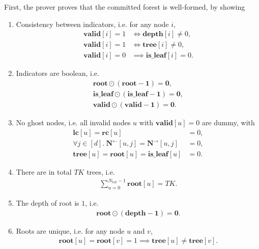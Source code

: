 First, the prover proves that the committed forest is well-formed, by showing
\begin{enumerate}
  \item Consistency between indicators, i.e. for any node $i$,
  \begin{align}
    \mathbf{valid}[i]=1 &\iff \mathbf{depth}[i] \neq 0,\\
    \mathbf{valid}[i]=1 &\iff \mathbf{tree}[i] \neq 0,\\
    \mathbf{valid}[i]=0 &\implies \mathbf{is\_leaf}[i] = 0.
  \end{align}

  \item Indicators are boolean, i.e.
  \begin{align}
    \mathbf{root}\odot(\mathbf{root}-\mathbf{1}) = \mathbf{0},\\
    \mathbf{is\_leaf}\odot(\mathbf{is\_leaf}-\mathbf{1}) = \mathbf{0},\\
    \mathbf{valid}\odot(\mathbf{valid}-\mathbf{1}) = \mathbf{0}.
  \end{align}

  \item No ghost nodes, i.e. all invalid nodes $u$ with $\mathbf{valid}[u]=0$ are dummy, with
    \begin{align}
    \mathbf{lc}[u] = \mathbf{rc}[u] &= 0,\\
    \forall j\in [d].\ \mathbf{N}^{\leftarrow}[u, j] = \mathbf{N}^{\rightarrow}[u, j] &= 0,\\
    \mathbf{tree}[u] = \mathbf{root}[u] = \mathbf{is\_leaf}[u] &= 0.
    \end{align}

  \item There are in total $TK$ trees, i.e.
  \begin{align}
    \sum_{u=0}^{N_{\mathrm{tot}}-1} \mathbf{root}[u] = TK.
  \end{align}

  \item The depth of root is $1$, i.e.
  \begin{align}
    \mathbf{root}\odot (\mathbf{depth}-\mathbf{1}) = \mathbf{0}.
  \end{align}

  \item Roots are unique, i.e. for any node $u$ and $v$,
  \begin{align}
    \mathbf{root}[u] = \mathbf{root}[v] = 1\implies \mathbf{tree}[u]\neq \mathbf{tree}[v].
  \end{align}


\end{enumerate}
